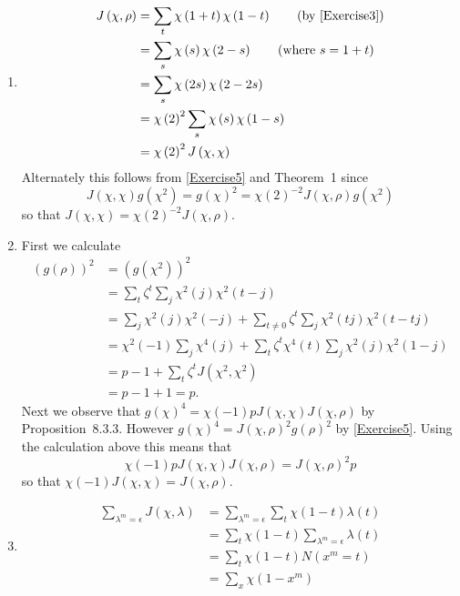 \documentclass[12pt]{article}
\begin{document}
\begin{enumerate}
\item %
\begin{align*}
J\left(\chi,\rho\right)
&=\sum_t\chi\left(1+t\right)\chi\left(1-t\right)
\qquad\text{(by \autoref{Exercise3})}\\
&=\sum_s\chi\left(s\right)\chi\left(2-s\right)
\qquad\text{(where $s=1+t$)}\\
&=\sum_s\chi\left(2s\right)\chi\left(2-2s\right)\\
&=\chi\left(2\right)^2
\sum_s\chi\left(s\right)\chi\left(1-s\right)\\
&=\chi\left(2\right)^2J\left(\chi,\chi\right)
\end{align*}
Alternately this follows from \autoref{Exercise5}
and Theorem~1 since
\[J\left(\chi,\chi\right)g\left(\chi^2\right)
=g\left(\chi\right)^2=\chi\left(2\right)^{-2}
J\left(\chi,\rho\right)g\left(\chi^2\right)\]
so that $J\left(\chi,\chi\right)=\chi\left(2\right)^{-2}
J\left(\chi,\rho\right)$.

\item %
First we calculate
\begin{align*}
\left(g\left(\rho\right)\right)^2
&=\left(g\left(\chi^2\right)\right)^2\\
&=\sum_t\zeta^t\sum_j\chi^2\left(j\right)
\chi^2\left(t-j\right)\\
&=\sum_j\chi^2\left(j\right)\chi^2\left(-j\right)
+\sum_{t\ne 0}\zeta^t\sum_j\chi^2\left(tj\right)
\chi^2\left(t-tj\right)\\
&=\chi^2\left(-1\right)\sum_j\chi^4\left(j\right)
+\sum_t\zeta^t\chi^4\left(t\right)\sum_j\chi^2\left(j\right)
\chi^2\left(1-j\right)\\
&=p-1+\sum_t\zeta^tJ\left(\chi^2,\chi^2\right)\\
&=p-1+1=p.
\end{align*}
Next we observe that
$g\left(\chi\right)^4=\chi\left(-1\right)pJ\left(\chi,\chi\right)
J\left(\chi,\rho\right)$ by Proposition~8.3.3.
However $g\left(\chi\right)^4=J\left(\chi,\rho\right)^2g\left(\rho\right)^2$
by \autoref{Exercise5}.
Using the calculation above this means that
\[\chi\left(-1\right)pJ\left(\chi,\chi\right)J\left(\chi,\rho\right)=
J\left(\chi,\rho\right)^2p\]
so that $\chi\left(-1\right)J\left(\chi,\chi\right)=J\left(\chi,\rho\right)$.

\item %
\begin{align*}
\sum_{\lambda^m=\epsilon}J\left(\chi,\lambda\right)
&=\sum_{\lambda^m=\epsilon}\sum_t\chi\left(1-t\right)\lambda\left(t\right)\\
&=\sum_t\chi\left(1-t\right)\sum_{\lambda^m=\epsilon}\lambda\left(t\right)\\
&=\sum_t\chi\left(1-t\right)N\left(x^m=t\right)\\
&=\sum_x\chi\left(1-x^m\right)
\end{align*}


\end{enumerate}
\end{document}
